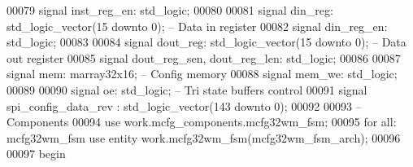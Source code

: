 \begin{DoxyCode}
00079     \textcolor{keywordflow}{signal} \textcolor{vhdlchar}{inst_reg_en}\textcolor{vhdlchar}{:} \textcolor{comment}{std\_logic};
00080 
00081     \textcolor{keywordflow}{signal} \textcolor{vhdlchar}{din_reg}\textcolor{vhdlchar}{:} \textcolor{comment}{std\_logic\_vector}\textcolor{vhdlchar}{(}\textcolor{vhdllogic}{}\textcolor{vhdllogic}{15} \textcolor{keywordflow}{downto} \textcolor{vhdllogic}{}\textcolor{vhdllogic}{0}\textcolor{vhdlchar}{)};\textcolor{keyword}{      -- Data in register}
00082     \textcolor{keywordflow}{signal} \textcolor{vhdlchar}{din_reg_en}\textcolor{vhdlchar}{:} \textcolor{comment}{std\_logic};
00083     
00084     \textcolor{keywordflow}{signal} \textcolor{vhdlchar}{dout_reg}\textcolor{vhdlchar}{:} \textcolor{comment}{std\_logic\_vector}\textcolor{vhdlchar}{(}\textcolor{vhdllogic}{}\textcolor{vhdllogic}{15} \textcolor{keywordflow}{downto} \textcolor{vhdllogic}{}\textcolor{vhdllogic}{0}\textcolor{vhdlchar}{)};\textcolor{keyword}{     -- Data out register}
00085     \textcolor{keywordflow}{signal} \textcolor{vhdlchar}{dout_reg_sen}\textcolor{vhdlchar}{,} \textcolor{vhdlchar}{dout_reg_len}\textcolor{vhdlchar}{:} \textcolor{comment}{std\_logic};
00086     
00087     \textcolor{keywordflow}{signal} \textcolor{vhdlchar}{mem}\textcolor{vhdlchar}{:} \textcolor{vhdlchar}{marray32x16};\textcolor{keyword}{                                    -- Config memory}
00088     \textcolor{keywordflow}{signal} \textcolor{vhdlchar}{mem_we}\textcolor{vhdlchar}{:} \textcolor{comment}{std\_logic};
00089     
00090     \textcolor{keywordflow}{signal} \textcolor{vhdlchar}{oe}\textcolor{vhdlchar}{:} \textcolor{comment}{std\_logic};\textcolor{keyword}{                                       -- Tri state buffers control}
00091     \textcolor{keywordflow}{signal} \textcolor{vhdlchar}{spi_config_data_rev}  \textcolor{vhdlchar}{:} \textcolor{comment}{std\_logic\_vector}\textcolor{vhdlchar}{(}\textcolor{vhdllogic}{}\textcolor{vhdllogic}{143} \textcolor{keywordflow}{downto} \textcolor{vhdllogic}{}\textcolor{vhdllogic}{0}\textcolor{vhdlchar}{)};
00092     
00093 \textcolor{keyword}{    -- Components}
00094 \textcolor{vhdlkeyword}{    use }work.mcfg_components.mcfg32wm\_fsm;
00095     \textcolor{keywordflow}{for} \textcolor{keywordflow}{all}\textcolor{vhdlchar}{:} \textcolor{vhdlchar}{mcfg32wm\_fsm} \textcolor{keywordflow}{use} \textcolor{keywordflow}{entity} \textcolor{vhdlchar}{work}\textcolor{vhdlchar}{.}\textcolor{vhdlchar}{mcfg32wm\_fsm}\textcolor{vhdlchar}{(}\textcolor{vhdlchar}{mcfg32wm\_fsm\_arch}\textcolor{vhdlchar}{)};
00096 
00097 \textcolor{vhdlkeyword}{begin}

\end{DoxyCode}
